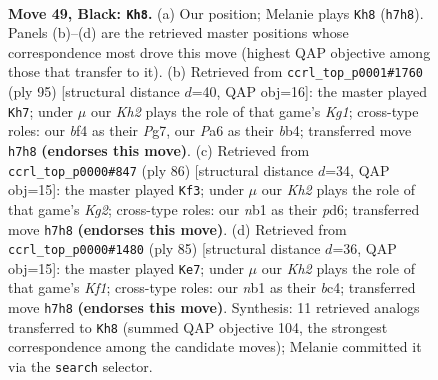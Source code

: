 \documentclass[11pt]{article}
\begin{document}
\clearpage

\begin{figure}[p]\centering
\begin{subfigure}{0.46\textwidth}\centering
\resizebox{\linewidth}{!}{%
\newchessgame
\chessboard[
  setfen={5K2/n1P4k/p7/P4p1p/4pB2/5bP1/8/RN1r4 b - - 5 49},
  showmover=false,
  pgfstyle=straightmove, color=movearrow, markmove={h7-h8}
]}
\caption{}
\end{subfigure}\hfill
\begin{subfigure}{0.46\textwidth}\centering
\resizebox{\linewidth}{!}{%
\newchessgame
\chessboard[
  setfen={6k1/6p1/5p2/3b3p/1B3P1P/P1R3P1/6r1/3K4 b - - 8 48},
  showmover=false,
  pgfstyle=straightmove, color=movearrow, markmove={g8-h7}
]}
\caption{}
\end{subfigure}
\\[4pt]
\begin{subfigure}{0.46\textwidth}\centering
\resizebox{\linewidth}{!}{%
\newchessgame
\chessboard[
  setfen={8/3r1pk1/2Rp4/3Bb1pP/4P1P1/8/6K1/8 w - - 3 44},
  showmover=false,
  pgfstyle=straightmove, color=movearrow, markmove={g2-f3}
]}
\caption{}
\end{subfigure}\hfill
\begin{subfigure}{0.46\textwidth}\centering
\resizebox{\linewidth}{!}{%
\newchessgame
\chessboard[
  setfen={5k2/8/7p/2pP1p2/1rBb1P2/7P/2R3P1/4K3 b - - 0 43},
  showmover=false,
  pgfstyle=straightmove, color=movearrow, markmove={f8-e7}
]}
\caption{}
\end{subfigure}
\caption{\textbf{Move 49, Black: \texttt{Kh8}.} (a) Our position; Melanie plays \texttt{Kh8} (\texttt{h7h8}). Panels (b)--(d) are the retrieved master positions whose correspondence most drove this move (highest QAP objective among those that transfer to it). (b) Retrieved from \texttt{ccrl\_top\_p0001\#1760} (ply 95) [structural distance $d$=40, QAP obj=16]: the master played \texttt{Kh7}; under $\mu$ our \emph{Kh2} plays the role of that game's \emph{Kg1}; cross-type roles: our \emph{b}f4 as their \emph{P}g7, our \emph{P}a6 as their \emph{b}b4; transferred move \texttt{h7h8} \textbf{(endorses this move)}. (c) Retrieved from \texttt{ccrl\_top\_p0000\#847} (ply 86) [structural distance $d$=34, QAP obj=15]: the master played \texttt{Kf3}; under $\mu$ our \emph{Kh2} plays the role of that game's \emph{Kg2}; cross-type roles: our \emph{n}b1 as their \emph{p}d6; transferred move \texttt{h7h8} \textbf{(endorses this move)}. (d) Retrieved from \texttt{ccrl\_top\_p0000\#1480} (ply 85) [structural distance $d$=36, QAP obj=15]: the master played \texttt{Ke7}; under $\mu$ our \emph{Kh2} plays the role of that game's \emph{Kf1}; cross-type roles: our \emph{n}b1 as their \emph{b}c4; transferred move \texttt{h7h8} \textbf{(endorses this move)}. Synthesis: 11 retrieved analogs transferred to \texttt{Kh8} (summed QAP objective 104, the strongest correspondence among the candidate moves); Melanie committed it via the \texttt{search} selector.}
\label{fig:thought-m97}
\end{figure}
\end{document}
